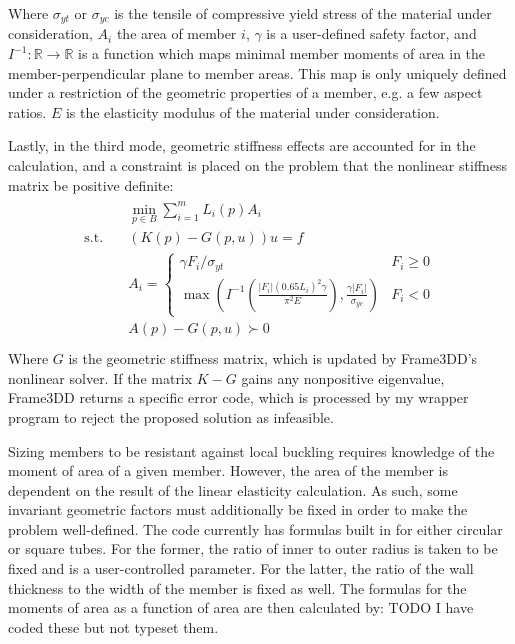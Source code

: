 \documentclass{article}
\begin{document}
Where $\sigma_{yt}$ or $\sigma_{yc}$ is the tensile of compressive yield stress of the material under consideration, $A_i$ the area of
member $i$, $\gamma$ is a user-defined safety factor, and $I^{-1} : \mathbb{R} \rightarrow \mathbb{R}$
is a function which maps minimal member moments of area in the member-perpendicular plane to member areas.
This map is only uniquely defined under a restriction of the geometric properties of a member, e.g. a few aspect ratios.
$E$ is the elasticity modulus of the material under consideration.

Lastly, in the third mode, geometric stiffness effects are accounted for in the calculation,
and a constraint is placed on the problem that the nonlinear stiffness matrix be positive
definite:
\begin{align}
\begin{split}
  & \min_{p\in B} \sum_{i=1}^m L_i(p) A_i \\
  \text{s.t.} \quad & \left(K(p)-G(p,u)\right) u = f \\
                    & A_i = \begin{cases} \gamma F_i / \sigma_{yt} & F_i  \geq 0 \\
                      \max\left(I^{-1}\left(\frac{|F_i| (0.65 L_i)^2 \gamma}{\pi^2 E}\right), \frac{\gamma|F_i|}{\sigma_{yc}}\right) & F_i < 0
                    \end{cases} \\
                    & A(p) - G(p,u) \succ 0 \\
\end{split}
\label{eq:mode3}
\end{align}
Where $G$ is the geometric stiffness matrix, which is updated by Frame3DD's nonlinear solver.
If the matrix $K-G$ gains any nonpositive eigenvalue, Frame3DD returns a specific error code,
which is processed by my wrapper program to reject the proposed solution as infeasible.

Sizing members to be resistant against local buckling requires knowledge of the moment of area
of a given member. However, the area of the member is dependent on the result of the linear
elasticity calculation. As such, some invariant geometric factors must additionally be
fixed in order to make the problem well-defined. The code currently has formulas built
in for either circular or square tubes. For the former, the ratio of inner to outer radius
is taken to be fixed and is a user-controlled parameter. For the latter, the ratio of the
wall thickness to the width of the member is fixed as well. The formulas for the moments
of area as a function of area are then calculated by: TODO I have coded these but not typeset
them.
\end{document}
